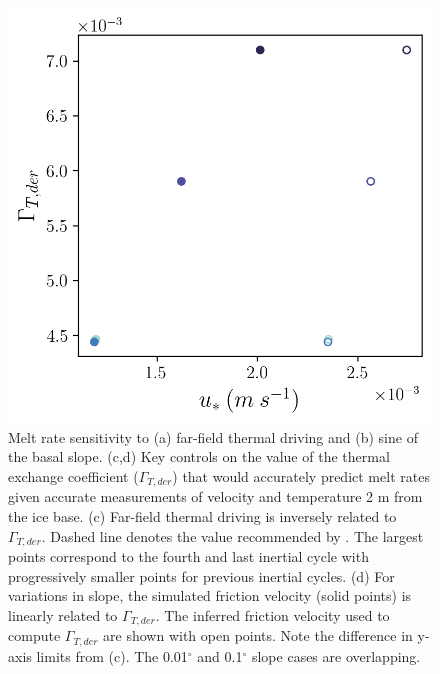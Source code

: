\documentclass[draft]{agujournal2019}
\begin{document}
\begin{figure}[h!]
    \begin{minipage}{0.5\textwidth}
        \includegraphics[trim={0 0 0 0cm},clip,width=\textwidth]{Figures/gammaT_us_cmp_dslope_43h_tav13h.png}
    \end{minipage}
    \caption{Melt rate sensitivity to (a) far-field thermal driving and (b) sine of the basal slope. (c,d) Key controls on the value of the thermal exchange coefficient ($\Gamma_{T,der}$) that would accurately predict melt rates given accurate measurements of velocity and temperature 2 m from the ice base. (c) Far-field thermal driving is inversely related to $\Gamma_{T,der}$. Dashed line denotes the value recommended by . The largest points correspond to the fourth and last inertial cycle with progressively smaller points for previous inertial cycles. (d) For variations in slope, the simulated friction velocity (solid points) is linearly related to $\Gamma_{T,der}$. The inferred friction velocity used to compute $\Gamma_{T,der}$ are shown with open points. Note the difference in y-axis limits from (c). The 0.01$^{\circ}$ and 0.1$^{\circ}$ slope cases are overlapping.}
    \label{fig:melt_sensitivity}
\end{figure}
\end{document}
